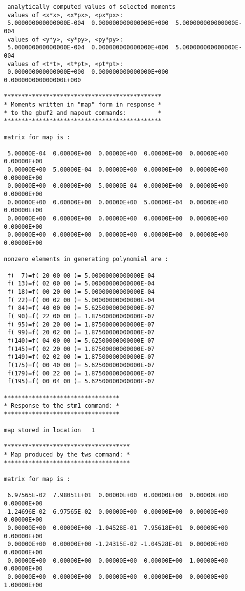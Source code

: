 \begin{footnotesize}
\begin{verbatim}
 analytically computed values of selected moments
 values of <x*x>, <x*px>, <px*px>:
 5.000000000000000E-004  0.000000000000000E+000  5.000000000000000E-004
 values of <y*y>, <y*py>, <py*py>:
 5.000000000000000E-004  0.000000000000000E+000  5.000000000000000E-004
 values of <t*t>, <t*pt>, <pt*pt>:
 0.000000000000000E+000  0.000000000000000E+000  0.000000000000000E+000

*********************************************
* Moments written in "map" form in response *
* to the gbuf2 and mapout commands:         *
*********************************************

matrix for map is :

 5.00000E-04  0.00000E+00  0.00000E+00  0.00000E+00  0.00000E+00  0.00000E+00
 0.00000E+00  5.00000E-04  0.00000E+00  0.00000E+00  0.00000E+00  0.00000E+00
 0.00000E+00  0.00000E+00  5.00000E-04  0.00000E+00  0.00000E+00  0.00000E+00
 0.00000E+00  0.00000E+00  0.00000E+00  5.00000E-04  0.00000E+00  0.00000E+00
 0.00000E+00  0.00000E+00  0.00000E+00  0.00000E+00  0.00000E+00  0.00000E+00
 0.00000E+00  0.00000E+00  0.00000E+00  0.00000E+00  0.00000E+00  0.00000E+00

nonzero elements in generating polynomial are :

 f(  7)=f( 20 00 00 )= 5.00000000000000E-04
 f( 13)=f( 02 00 00 )= 5.00000000000000E-04
 f( 18)=f( 00 20 00 )= 5.00000000000000E-04
 f( 22)=f( 00 02 00 )= 5.00000000000000E-04
 f( 84)=f( 40 00 00 )= 5.62500000000000E-07
 f( 90)=f( 22 00 00 )= 1.87500000000000E-07
 f( 95)=f( 20 20 00 )= 1.87500000000000E-07
 f( 99)=f( 20 02 00 )= 1.87500000000000E-07
 f(140)=f( 04 00 00 )= 5.62500000000000E-07
 f(145)=f( 02 20 00 )= 1.87500000000000E-07
 f(149)=f( 02 02 00 )= 1.87500000000000E-07
 f(175)=f( 00 40 00 )= 5.62500000000000E-07
 f(179)=f( 00 22 00 )= 1.87500000000000E-07
 f(195)=f( 00 04 00 )= 5.62500000000000E-07

*********************************
* Response to the stm1 command: *
*********************************

map stored in location   1

************************************
* Map produced by the tws command: *
************************************

matrix for map is :

 6.97565E-02  7.98051E+01  0.00000E+00  0.00000E+00  0.00000E+00  0.00000E+00
-1.24696E-02  6.97565E-02  0.00000E+00  0.00000E+00  0.00000E+00  0.00000E+00
 0.00000E+00  0.00000E+00 -1.04528E-01  7.95618E+01  0.00000E+00  0.00000E+00
 0.00000E+00  0.00000E+00 -1.24315E-02 -1.04528E-01  0.00000E+00  0.00000E+00
 0.00000E+00  0.00000E+00  0.00000E+00  0.00000E+00  1.00000E+00  0.00000E+00
 0.00000E+00  0.00000E+00  0.00000E+00  0.00000E+00  0.00000E+00  1.00000E+00


\end{verbatim}
\end{footnotesize}
